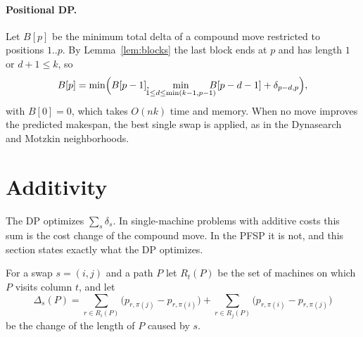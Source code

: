 \documentclass[letterpaper]{article} %
\theoremstyle{definition}
\begin{document}
\paragraph{Positional DP.} Let $B[p]$ be the minimum total delta of a
compound move restricted to positions $1..p$. By Lemma~\ref{lem:blocks}
the last block ends at $p$ and has length $1$ or $d+1\leq k$, so
\begin{equation}
B[p]=\min\Bigl(B[p-1],\ \hspace*{-3mm}\min_{1\le d\le \min(k-1,p-1)}\hspace*{-3mm} B[p-d-1]+\delta_{p-d,p}\Bigr),
\end{equation}
with $B[0]=0$, which takes $O(nk)$ time and memory. When no move improves
the predicted makespan, the best single swap is applied, as in the
Dynasearch and Motzkin neighborhoods.

\section{Additivity}\label{sec:additivity}
The DP optimizes $\sum_s\delta_s$. In single-machine problems with
additive costs this sum is the cost change of the compound move. In the
PFSP it is not, and this section states exactly what the DP optimizes.

For a swap $s=(i,j)$ and a path $P$ let $R_t(P)$ be the set of machines
on which $P$ visits column $t$, and let
\begin{equation}\label{eq:delta-path}
\Delta_s(P)=\!\!\sum_{r\in R_i(P)}\!\!\bigl(p_{r,\pi(j)}-p_{r,\pi(i)}\bigr)
+\!\!\sum_{r\in R_j(P)}\!\!\bigl(p_{r,\pi(i)}-p_{r,\pi(j)}\bigr)
\end{equation}
be the change of the length of $P$ caused by $s$.
\end{document}
